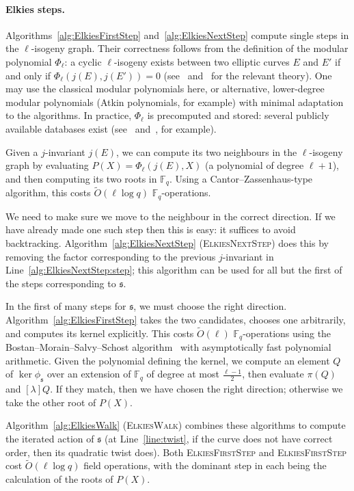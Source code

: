 \documentclass{llncs}
\newcommand{\F}{\mathbb{F}}
\newcommand{\softO}{\tilde{O}}
\newcommand{\algstyle}[1]{\textsc{#1}}
\renewcommand{\frak}{\mathfrak}
\begin{document}
\paragraph{Elkies steps.}
Algorithms~\ref{alg:ElkiesFirstStep}
and~\ref{alg:ElkiesNextStep} 
compute single steps in the $\ell$-isogeny graph.
Their correctness
follows from the definition of the modular polynomial $\Phi_\ell$:
a cyclic $\ell$-isogeny exists between two elliptic
curves $E$ and $E'$ if and only if $\Phi_\ell(j(E), j(E')) = 0$
(see~\cite[\S6]{schoof95} and~\cite[\S3]{Elkies98} for the relevant theory).
One may use the classical modular polynomials here,
or alternative, lower-degree modular polynomials
(Atkin polynomials, for example)
with minimal adaptation to the algorithms.
In practice, $\Phi_\ell$ is precomputed and stored:
several publicly available databases exist
(see~\cite{Echidna} and~\cite{SutherlandDatabase,BrokerLS12,BruinierOS16}, for example).

Given a $j$-invariant $j(E)$,
we can compute its two neighbours in the $\ell$-isogeny graph
by evaluating $P(X) = \Phi_\ell(j(E),X)$
(a polynomial of degree $\ell+1$),
and then computing its two roots in $\F_q$.
Using a Cantor--Zassenhaus-type algorithm,
this costs
$\softO(\ell\log q)$ $\F_q$-operations.

We need to make sure we move to the neighbour in the correct direction.
If we have already made one such step then this is easy:
it suffices to avoid backtracking.
Algorithm~\ref{alg:ElkiesNextStep} (\algstyle{ElkiesNextStep})
does this by
removing the factor corresponding to the previous $j$-invariant 
in Line~\ref{alg:ElkiesNextStep:step};
this algorithm can be used for all but the first of the steps
corresponding to $\frak{s}$.

In the first of many steps for $\frak{s}$,
we must choose the right direction.
Algorithm~\ref{alg:ElkiesFirstStep}
takes the two candidates,
chooses one arbitrarily,
and computes its kernel explicitly.
This costs $\softO(\ell)$ $\F_q$-operations
using the Bostan--Morain--Salvy--Schost algorithm~\cite{BMSS08}
with asymptotically fast polynomial arithmetic.
Given the polynomial defining the kernel,
we compute an element $Q$ of $\ker\phi_\frak{s}$
over an extension of $\F_q$ of degree at most $\frac{\ell-1}{2}$,
then evaluate $\pi(Q)$ and $[\lambda]Q$.
If they match, then we have chosen the right direction;
otherwise we take the other root of $P(X)$.

Algorithm~\ref{alg:ElkiesWalk} (\algstyle{ElkiesWalk}) 
combines these algorithms
to compute the iterated action of $\frak{s}$
(at Line~\ref{line:twist}, if the curve does not have correct order,
then its quadratic twist does).
Both \algstyle{ElkiesFirstStep} and \algstyle{ElkiesFirstStep}
cost $\softO(\ell\log q)$ field operations,
with the dominant step in each being the calculation of the roots of $P(X)$.
\end{document}
